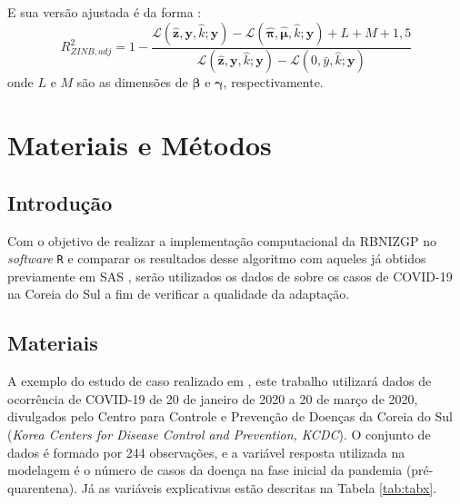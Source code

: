 \documentclass[12pt, a4paper, twoside]{report}
\numberwithin{equation}{section} %
\begin{document}
E sua versão ajustada é da forma \citep{martin2016}:
\begin{equation}
    R_{Z I N B, a d j}^2=1-\frac{\mathcal{L}(\hat{\boldsymbol{z}}, \boldsymbol{y}, \hat{k} ; \boldsymbol{y})-\mathcal{L}(\hat{\boldsymbol{\pi}}, \hat{\boldsymbol{\mu}}, \hat{k} ; \boldsymbol{y})+L+M+1,5}{\mathcal{L}(\hat{\boldsymbol{z}}, \boldsymbol{y}, \hat{k} ; \boldsymbol{y})-\mathcal{L}(0, \bar{y}, \hat{k} ; \boldsymbol{y})}
\end{equation}
onde $L$ e $M$ são as dimensões de $\boldsymbol{\beta}$ e $\boldsymbol{\gamma}$, respectivamente.

\chapter{Materiais e Métodos}

\section{Introdução}

Com o objetivo de realizar a implementação computacional da RBNIZGP no \textit{software} \texttt{R} e comparar os resultados desse algoritmo com aqueles já obtidos previamente em SAS \citep{dasilva2023}, serão utilizados os dados  de \cite{weinstein2021precision} sobre os casos de COVID-19 na Coreia do Sul a fim de verificar a qualidade da adaptação. 


\section{Materiais}\label{secao_4_4}

A exemplo do estudo de caso realizado em \cite{dasilva2023}, este trabalho utilizará dados de ocorrência de COVID-19 de 20 de janeiro de 2020 a 20 de março de 2020, divulgados pelo Centro para Controle e Prevenção de Doenças da Coreia do Sul (\textit{Korea Centers for Disease Control and Prevention, KCDC}). O conjunto de dados é formado por  244 observações, e a variável resposta utilizada na modelagem é o número de casos da doença na fase inicial da pandemia (pré-quarentena). Já as variáveis explicativas estão descritas na Tabela \ref{tab:tabx}.

\end{document}
